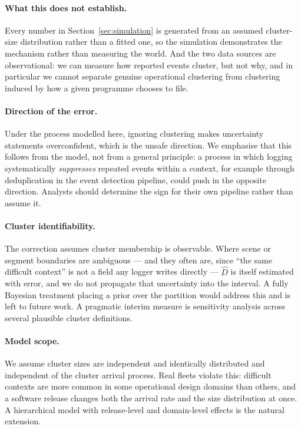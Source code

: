 \documentclass[11pt]{article}
\begin{document}
\paragraph{What this does not establish.} Every number in
Section~\ref{sec:simulation} is generated from an assumed cluster-size
distribution rather than a fitted one, so the simulation demonstrates the
mechanism rather than measuring the world. And the two data sources are
observational: we can measure how reported events cluster, but not why, and in
particular we cannot separate genuine operational clustering from clustering
induced by how a given programme chooses to file.

\paragraph{Direction of the error.} Under the process modelled here, ignoring
clustering makes uncertainty statements overconfident, which is the unsafe
direction. We emphasise that this follows from the model, not from a general
principle: a process in which logging systematically \emph{suppresses} repeated
events within a context, for example through deduplication in the event detection
pipeline, could push in the opposite direction. Analysts should determine the sign
for their own pipeline rather than assume it.

\paragraph{Cluster identifiability.} The correction assumes cluster membership is
observable. Where scene or segment boundaries are ambiguous --- and they often are,
since ``the same difficult context'' is not a field any logger writes directly ---
$\hat{D}$ is itself estimated with error, and we do not propagate that uncertainty
into the interval. A fully Bayesian treatment placing a prior over the partition
would address this and is left to future work. A pragmatic interim measure is
sensitivity analysis across several plausible cluster definitions.

\paragraph{Model scope.} We assume cluster sizes are independent and identically
distributed and independent of the cluster arrival process. Real fleets violate
this: difficult contexts are more common in some operational design domains than
others, and a software release changes both the arrival rate and the size
distribution at once. A hierarchical model with release-level and domain-level
effects is the natural extension.
\end{document}
